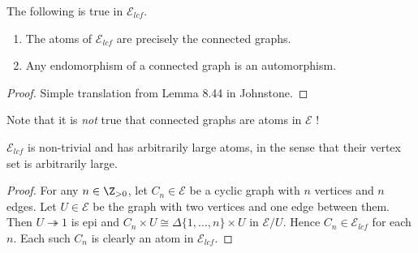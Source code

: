 %
%


\begin{corollary} The following is true in $\mathscr{E}_{lcf}$.
\begin{enumerate}
	\item The atoms of $\mathscr{E}_{lcf}$ are precisely the connected graphs.
	\item Any endomorphism of a connected graph is an automorphism.
\end{enumerate}
\end{corollary}
\begin{proof}
Simple translation from Lemma 8.44 in Johnstone.
\end{proof}

Note that it is \emph{not} true that connected graphs are atoms in $\mathscr{E}$ !

\begin{lemma}
$\mathscr{E}_{lcf}$ is non-trivial and has arbitrarily large atoms, in the sense that their vertex set is arbitrarily large.
\end{lemma}
\begin{proof}
For any $n \in \Z_{>0}$, let $C_n \in \mathscr{E}$ be a cyclic graph with $n$ vertices and $n$ edges. Let $U \in \mathscr{E}$ be the graph with two vertices and one edge between them. Then $U \twoheadrightarrow 1$ is epi and $C_n \times U \cong \Delta \{1,\ldots,n\} \times U$ in $\mathscr{E}/U$. Hence $C_n \in \mathscr{E}_{lcf}$ for each $n$. Each such $C_n$ is clearly an atom in $\mathscr{E}_{lcf}$.
\end{proof}

